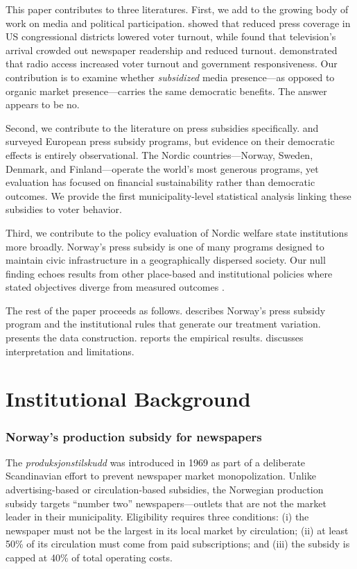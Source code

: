 \documentclass[12pt]{article}
\begin{document}
This paper contributes to three literatures. First, we add to the growing body of work on media and political participation. \citet{snyder2010press} showed that reduced press coverage in US congressional districts lowered voter turnout, while \citet{gentzkow2006television} found that television's arrival crowded out newspaper readership and reduced turnout. \citet{stromberg2004radio} demonstrated that radio access increased voter turnout and government responsiveness. Our contribution is to examine whether \textit{subsidized} media presence---as opposed to organic market presence---carries the same democratic benefits. The answer appears to be no.

Second, we contribute to the literature on press subsidies specifically. \citet{picard1988press} and \citet{murschetz2020state} surveyed European press subsidy programs, but evidence on their democratic effects is entirely observational. The Nordic countries---Norway, Sweden, Denmark, and Finland---operate the world's most generous programs, yet evaluation has focused on financial sustainability \citep{ohlsson2015nordic} rather than democratic outcomes. We provide the first municipality-level statistical analysis linking these subsidies to voter behavior.

Third, we contribute to the policy evaluation of Nordic welfare state institutions more broadly. Norway's press subsidy is one of many programs designed to maintain civic infrastructure in a geographically dispersed society. Our null finding echoes results from other place-based and institutional policies where stated objectives diverge from measured outcomes \citep{kline2013place, neumark2019place}.

The rest of the paper proceeds as follows.  describes Norway's press subsidy program and the institutional rules that generate our treatment variation.  presents the data construction.  reports the empirical results.  discusses interpretation and limitations.

\section{Institutional Background} \label{sec:background}

\subsubsection*{Norway's production subsidy for newspapers} The \textit{produksjonstilskudd} was introduced in 1969 as part of a deliberate Scandinavian effort to prevent newspaper market monopolization. Unlike advertising-based or circulation-based subsidies, the Norwegian production subsidy targets ``number two'' newspapers---outlets that are not the market leader in their municipality. Eligibility requires three conditions: (i) the newspaper must not be the largest in its local market by circulation; (ii) at least 50\% of its circulation must come from paid subscriptions; and (iii) the subsidy is capped at 40\% of total operating costs.
\end{document}
